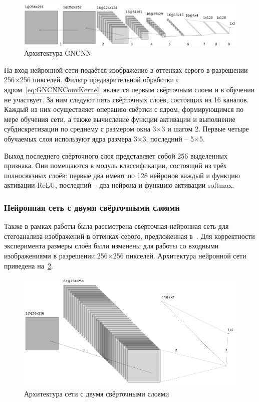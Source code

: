 \begin{figure}
\centering
\includegraphics[width=1\textwidth]{include/graphics/im_3-gncnn_gray_architecture}
\caption{Архитектура GNCNN}
\label{fig:GNCNNArchitecture}
\end{figure}

На вход нейронной сети подаётся изображение в оттенках серого в разрешении 256×256 пикселей. Фильтр предварительной обработки с ядром~\eqref{eq:GNCNNConvKernel} является первым свёрточным слоем и в обучении не участвует. За ним следуют пять свёрточных слоёв, состоящих из 16 каналов. Каждый из них осуществляет операцию свёртки с ядром, формирующимся по мере обучения сети, а также вычисление функции активации и выполнение субдискретизации по среднему с размером окна 3×3 и шагом 2. Первые четыре обучаемых слоя используют ядра размера 3×3, последний – 5×5.

Выход последнего свёрточного слоя представляет собой 256 выделенных признака. Они помещаются в модуль классификации, состоящий из трёх полносвязных слоёв: первые два имеют по 128 нейронов каждый и функцию активации ReLU, последний – два нейрона и функцию активации softmax.

\subsubsection{Нейронная сеть с двумя свёрточными слоями}
Также в рамках работы была рассмотрена свёрточная нейронная сеть для стегоанализа изображений в оттенках серого, предложенная в~\cite{FrenchCNN}. Для корректности эксперимента размеры слоёв были изменены для работы со входными изображениями в разрешении 256×256 пикселей. Архитектура нейронной сети приведена на~\ref{fig:FrenchCNNArchitecture}.

\begin{figure}[!htb]
\centering
\includegraphics[width=1\textwidth]{include/graphics/im_4-french_gray_architecture}
\caption{Архитектура сети с двумя свёрточными слоями}
\label{fig:FrenchCNNArchitecture}
\end{figure}

